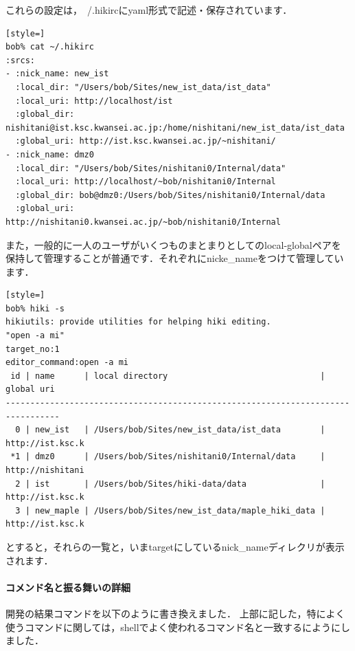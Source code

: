 これらの設定は，~/.hikircにyaml形式で記述・保存されています．
\begin{lstlisting}[style=]
bob% cat ~/.hikirc
:srcs:
- :nick_name: new_ist
  :local_dir: "/Users/bob/Sites/new_ist_data/ist_data"
  :local_uri: http://localhost/ist
  :global_dir: nishitani@ist.ksc.kwansei.ac.jp:/home/nishitani/new_ist_data/ist_data
  :global_uri: http://ist.ksc.kwansei.ac.jp/~nishitani/
- :nick_name: dmz0
  :local_dir: "/Users/bob/Sites/nishitani0/Internal/data"
  :local_uri: http://localhost/~bob/nishitani0/Internal
  :global_dir: bob@dmz0:/Users/bob/Sites/nishitani0/Internal/data
  :global_uri: http://nishitani0.kwansei.ac.jp/~bob/nishitani0/Internal
\end{lstlisting}
また，一般的に一人のユーザがいくつものまとまりとしてのlocal-globalペアを
保持して管理することが普通です．それぞれにnicke\_nameをつけて管理しています．
\begin{lstlisting}[style=]
bob% hiki -s
hikiutils: provide utilities for helping hiki editing.
"open -a mi"
target_no:1
editor_command:open -a mi
 id | name      | local directory                               | global uri     
---------------------------------------------------------------------------------
  0 | new_ist   | /Users/bob/Sites/new_ist_data/ist_data        | http://ist.ksc.k
 *1 | dmz0      | /Users/bob/Sites/nishitani0/Internal/data     | http://nishitani
  2 | ist       | /Users/bob/Sites/hiki-data/data               | http://ist.ksc.k
  3 | new_maple | /Users/bob/Sites/new_ist_data/maple_hiki_data | http://ist.ksc.k
\end{lstlisting}
とすると，それらの一覧と，いまtargetにしているnick\_nameディレクリが表示されます．

\paragraph{コメンド名と振る舞いの詳細}
開発の結果コマンドを以下のように書き換えました．
上部に記した，特によく使うコマンドに関しては，shellでよく使われるコマンド名と一致するにようにしました．

